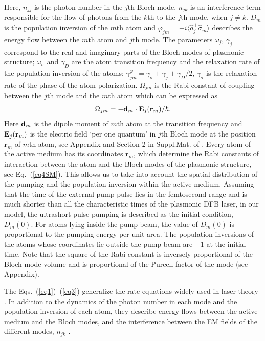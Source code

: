 \documentclass[aps,prapplied,amsmath,amssymb,onecolumn,superscriptaddress,showpacs,floatfix,longbibliography]{revtex4-1}
\begin{document}
Here, $n_{jj}$ is the photon number in the $j$th Bloch mode, $n_{jk}$ is an interference term responsible for the flow of photons from the $k$th to the $j$th mode, when $j \neq k$.
$D_m$ is the population inversion of the $m$th atom and $\varphi _{jm} = - i \langle \hat{a} _j^{+} \hat{\sigma} _m \rangle$ describes the energy flow between the $m$th atom and $j$th mode.
The parameters $\omega _j$, $\gamma _j$ correspond to the real and imaginary parts of the Bloch modes of plasmonic structure; $\omega _{\sigma}$ and $\gamma _D$ are the atom transition frequency and the relaxation rate of the population inversion of the atoms; $\gamma _{jm}^{\varphi} = \gamma _{\sigma} + \gamma _j + \gamma _D / 2$, $\gamma _{\sigma}$ is the relaxation rate of the phase of the atom polarization.
$\Omega _{jm}$ is the Rabi constant of coupling between the $j$th mode and the $m$th atom which can be expressed as
\begin{equation}\label{eq4SM}
{\Omega _{jm}} =  - {{\bf{d}}_m} \cdot {{\bf{E}}_j}({{\bf{r}}_m})/ \hbar.
\end{equation}
Here ${{\bf{d}}_m}$ is the dipole moment of $m$th atom at the transition frequency and ${{\bf{E}}_j}({{\bf{r}}_m})$  is the electric field `per one quantum' in $j$th Bloch mode at the position $\textbf{r}_m$ of $m$th atom, see Appendix and Section 2 in Suppl.Mat. of \cite{nefedkin2018acsphot}. Every atom of the active medium has its coordinates $\textbf{r}_m$, which determine the Rabi constants of interaction between the atom and the Bloch modes of the plasmonic structure, see Eq.~(\ref{eq4SM}). This allows us to take into account the spatial distribution of the pumping and the population inversion within the active medium. Assuming that the time of the external pump pulse lies in the femtosecond range and is much shorter than all the characteristic times of the plasmonic DFB laser, in our model, the ultrashort pulse pumping is described as the initial condition, $D_m(0)$. For atoms lying inside the pump beam, the value of $D_m(0)$ is proportional to the pumping energy per unit area. The population inversions of the atoms whose coordinates lie outside the pump beam are $-1$ at the initial time. Note that the square of the Rabi constant is inversely proportional of the Bloch mode volume and is proportional of the Purcell factor of the mode (see Appendix).

The Eqs.~(\ref{eq1})--(\ref{eq3}) generalize the rate equations widely used in laser theory \cite{SiegmanLasers}.
In addition to the dynamics of the photon number in each mode and the population inversion of each atom, they describe energy flows between the active medium and the Bloch modes, and the interference between the EM fields of the different modes, $n_{jk}$ \cite{Zyablovsky2017approach}. 
\end{document}
